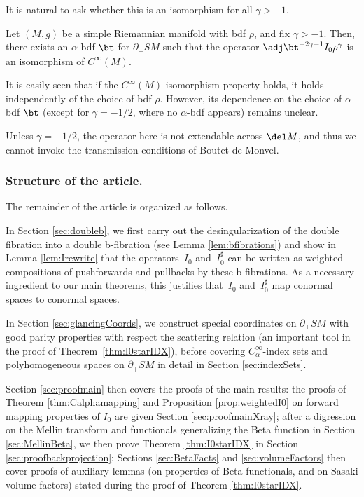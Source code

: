 It is natural to ask whether this is an isomorphism for all $\gamma>-1$.
\begin{Conjecture} \label{conj}
Let $(M,g)$ be a simple Riemannian manifold with bdf $\rho$, and fix $\gamma>-1$. Then, there exists an $\alpha$-bdf $\bt$ for $\partial_+ SM$ such that the operator $\adj \bt^{-2\gamma-1} I_0 \rho^\gamma$ is an isomorphism of $C^\infty(M)$.
\end{Conjecture}

It is easily seen that if the $C^\infty(M)$-isomorphism property holds, it holds independently of the choice of bdf $\rho$. However, its dependence on the choice of $\alpha$-bdf $\bt$ (except for $\gamma=-1/2$, where no $\alpha$-bdf appears) remains unclear.

Unless $\gamma= -1/2$, the operator here is not extendable across $\del M$, and thus we cannot invoke the transmission conditions of Boutet de Monvel.

\subsubsection*{Structure of the article.} The remainder of the article is organized as follows.

In Section \ref{sec:doubleb}, we first carry out the desingularization of the double fibration into a double b-fibration (see Lemma \ref{lem:bfibrations}) and show in Lemma \ref{lem:Irewrite} that the operators~$I_0$ and~$I_0^\sharp$ can be written as weighted compositions of pushforwards and pullbacks by these b-fibrations. As a necessary ingredient to our main theorems, this justifies that~$I_0$ and~$I_0^\sharp$ map conormal spaces to conormal spaces.

In Section \ref{sec:glancingCoords}, we construct special coordinates on $\partial_+ SM$ with good parity properties with respect the scattering relation (an important tool in the proof of Theorem~\ref{thm:I0starIDX}), before covering $C_\alpha^\infty$-index sets and polyhomogeneous spaces on $\partial_+ SM$ in detail in Section \ref{sec:indexSets}.

Section \ref{sec:proofmain} then covers the proofs of the main results: the proofs of Theorem \ref{thm:Calphamapping} and Proposition \ref{prop:weightedI0} on forward mapping properties of $I_0$ are given Section \ref{sec:proofmainXray}; after a digression on the Mellin transform and functionals generalizing the Beta function in Section \ref{sec:MellinBeta}, we then prove Theorem \ref{thm:I0starIDX} in Section \ref{sec:proofbackprojection}; Sections \ref{sec:BetaFacts} and \ref{sec:volumeFactors} then cover proofs of auxiliary lemmas (on properties of Beta functionals, and on Sasaki volume factors) stated during the proof of Theorem \ref{thm:I0starIDX}.

